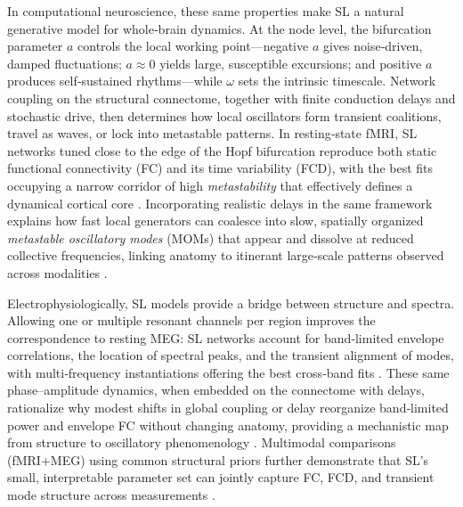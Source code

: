 \documentclass[12pt]{article}
\numberwithin{equation}{section}
\begin{document}
In computational neuroscience, these same properties make SL a natural generative model for whole‑brain dynamics. At the node level, the bifurcation parameter $a$ controls the local working point—negative $a$ gives noise‑driven, damped fluctuations; $a\approx 0$ yields large, susceptible excursions; and positive $a$ produces self‑sustained rhythms—while $\omega$ sets the intrinsic timescale. Network coupling on the structural connectome, together with finite conduction delays and stochastic drive, then determines how local oscillators form transient coalitions, travel as waves, or lock into metastable patterns. In resting‑state fMRI, SL networks tuned close to the edge of the Hopf bifurcation reproduce both static functional connectivity (FC) and its time variability (FCD), with the best fits occupying a narrow corridor of high \emph{metastability} that effectively defines a dynamical cortical core \cite{Deco2017Metastability}. Incorporating realistic delays in the same framework explains how fast local generators can coalesce into slow, spatially organized \emph{metastable oscillatory modes} (MOMs) that appear and dissolve at reduced collective frequencies, linking anatomy to itinerant large‑scale patterns observed across modalities \cite{Cabral2022MOMs}.

Electrophysiologically, SL models provide a bridge between structure and spectra. Allowing one or multiple resonant channels per region improves the correspondence to resting MEG: SL networks account for band‑limited envelope correlations, the location of spectral peaks, and the transient alignment of modes, with multi‑frequency instantiations offering the best cross‑band fits \cite{Deco2017MEG}. These same phase–amplitude dynamics, when embedded on the connectome with delays, rationalize why modest shifts in global coupling or delay reorganize band‑limited power and envelope FC without changing anatomy, providing a mechanistic map from structure to oscillatory phenomenology \cite{Cabral2022MOMs,siebenhuhnerSpectralPatternsMEG2025}. Multimodal comparisons (fMRI+MEG) using common structural priors further demonstrate that SL’s small, interpretable parameter set can jointly capture FC, FCD, and transient mode structure across measurements \cite{castaldo2023multi}.
\end{document}
